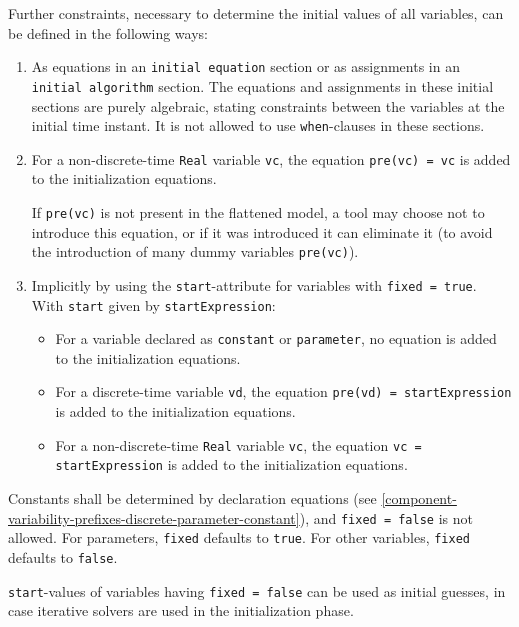 Further constraints, necessary to determine the initial values of all
variables, can be defined in the following ways:
\begin{enumerate}
\item
  As equations in an \lstinline!initial equation! section or as assignments in an \lstinline!initial algorithm! section.
  The equations and assignments in these initial sections are purely algebraic, stating constraints between the variables at the initial time instant.
  It is not allowed to use \lstinline!when!-clauses in these sections.
\item
  For a non-discrete-time \lstinline!Real! variable \lstinline!vc!, the equation \lstinline!pre(vc) = vc! is added to the initialization equations.
  \begin{nonnormative}
  If \lstinline!pre(vc)! is not present in the flattened model, a tool may choose not to introduce this equation, or if it was introduced
  it can eliminate it (to avoid the introduction of many dummy variables \lstinline!pre(vc)!).
  \end{nonnormative}
\item
  Implicitly by using the \lstinline!start!-attribute for variables with \lstinline!fixed = true!.  With \lstinline!start! given by \lstinline!startExpression!:
  \begin{itemize}
  \item
    For a variable declared as \lstinline!constant! or \lstinline!parameter!, no equation is added to the initialization equations.
  \item
    For a discrete-time variable \lstinline!vd!, the equation \lstinline!pre(vd) = startExpression! is added to the initialization equations.
  \item
    For a non-discrete-time \lstinline!Real! variable \lstinline!vc!, the equation \lstinline!vc = startExpression! is added to the initialization equations.
  \end{itemize}
\end{enumerate}

Constants shall be determined by declaration equations (see \cref{component-variability-prefixes-discrete-parameter-constant}), and \lstinline!fixed = false! is not allowed.
For parameters, \lstinline!fixed! defaults to \lstinline!true!.
For other variables, \lstinline!fixed! defaults to \lstinline!false!.

\lstinline!start!-values of variables having \lstinline!fixed = false! can be used as initial guesses, in case iterative solvers are used in the initialization phase.

